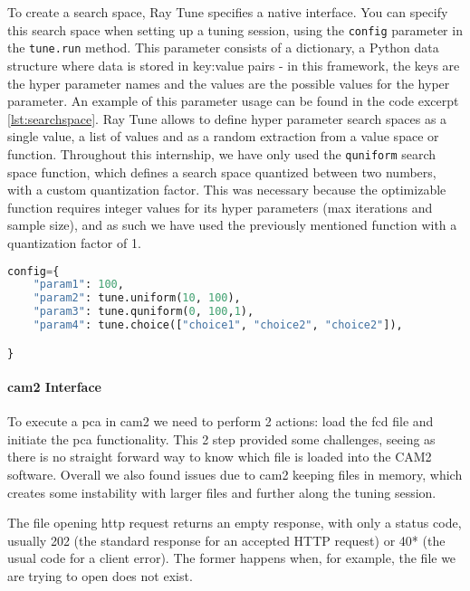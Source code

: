 To create a search space, Ray Tune specifies a native interface. You can specify this search space when setting up a tuning session, using the \verb!config! parameter in the \verb!tune.run! method. This parameter consists of a dictionary, a Python data structure where data is stored in key:value pairs - in this framework, the keys are the hyper parameter names and the values are the possible values for the hyper parameter. An example of this parameter usage can be found in the code excerpt \ref{lst:searchspace}. Ray Tune allows to define hyper parameter search spaces as a single value, a list of values and as a random extraction from a value space or function. Throughout this internship, we have only used the \verb!quniform! search space function, which defines a search space quantized between two numbers, with a custom quantization factor. This was necessary because the optimizable function requires integer values for its hyper parameters (max iterations and sample size), and as such we have used the previously mentioned function with a quantization factor of 1.


\begin{lstlisting}[language=Python, caption=Example Search Space configuration, captionpos=b, label={lst:searchspace}]
config={
    "param1": 100,
    "param2": tune.uniform(10, 100),
    "param3": tune.quniform(0, 100,1),
    "param4": tune.choice(["choice1", "choice2", "choice2"]),

}
\end{lstlisting}

\paragraph{\acrshort{cam2} Interface}

To execute a \acrshort{pca} in \acrshort{cam2} we need to perform 2 actions: load the \acrshort{fcd} file and initiate the \acrshort{pca} functionality. This 2 step provided some challenges, seeing as there is no straight forward way to know which file is loaded into the CAM2 software. Overall we also found issues due to \acrshort{cam2} keeping files in memory, which creates some instability with larger files and further along the tuning session.

The file opening \acrshort{http} request returns an empty response, with only a status code, usually 202 (the standard response for an accepted HTTP request) or 40* (the usual code for a client error). The former happens when, for example, the file we are trying to open does not exist.

